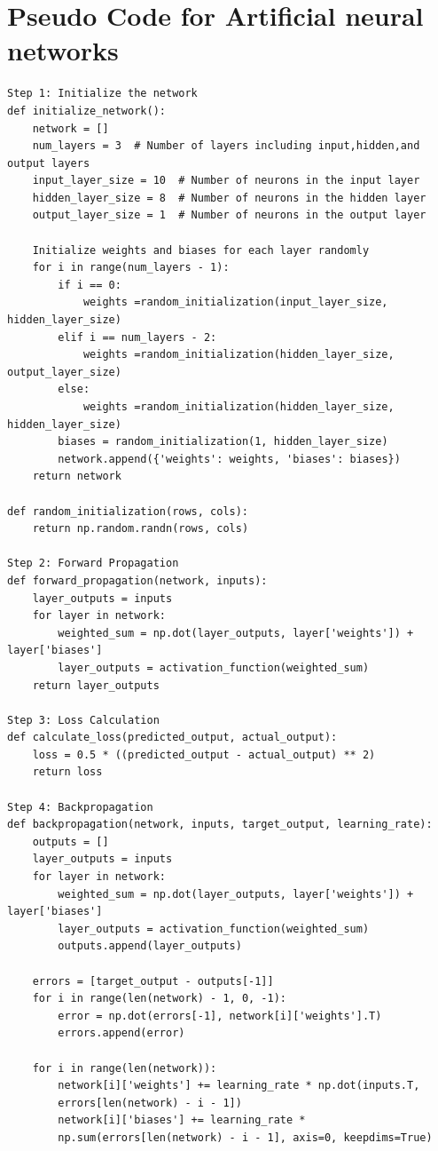 \documentclass[12pt,a4paper]{report}
\begin{document}
\section*{Pseudo Code for Artificial neural networks}
\begin{verbatim}
Step 1: Initialize the network
def initialize_network():
    network = []
    num_layers = 3  # Number of layers including input,hidden,and output layers
    input_layer_size = 10  # Number of neurons in the input layer
    hidden_layer_size = 8  # Number of neurons in the hidden layer
    output_layer_size = 1  # Number of neurons in the output layer
    
    Initialize weights and biases for each layer randomly
    for i in range(num_layers - 1):
        if i == 0:
            weights =random_initialization(input_layer_size, hidden_layer_size)
        elif i == num_layers - 2:
            weights =random_initialization(hidden_layer_size, output_layer_size)
        else:
            weights =random_initialization(hidden_layer_size, hidden_layer_size)
        biases = random_initialization(1, hidden_layer_size)
        network.append({'weights': weights, 'biases': biases})
    return network

def random_initialization(rows, cols):
    return np.random.randn(rows, cols)

Step 2: Forward Propagation
def forward_propagation(network, inputs):
    layer_outputs = inputs
    for layer in network:
        weighted_sum = np.dot(layer_outputs, layer['weights']) + layer['biases']
        layer_outputs = activation_function(weighted_sum)
    return layer_outputs

Step 3: Loss Calculation
def calculate_loss(predicted_output, actual_output):
    loss = 0.5 * ((predicted_output - actual_output) ** 2)  
    return loss

Step 4: Backpropagation
def backpropagation(network, inputs, target_output, learning_rate):
    outputs = []
    layer_outputs = inputs
    for layer in network:
        weighted_sum = np.dot(layer_outputs, layer['weights']) + layer['biases']
        layer_outputs = activation_function(weighted_sum)
        outputs.append(layer_outputs)
    
    errors = [target_output - outputs[-1]]
    for i in range(len(network) - 1, 0, -1):
        error = np.dot(errors[-1], network[i]['weights'].T)
        errors.append(error)
    
    for i in range(len(network)):
        network[i]['weights'] += learning_rate * np.dot(inputs.T, 
        errors[len(network) - i - 1])
        network[i]['biases'] += learning_rate * 
        np.sum(errors[len(network) - i - 1], axis=0, keepdims=True)


\end{verbatim}
\end{document}
